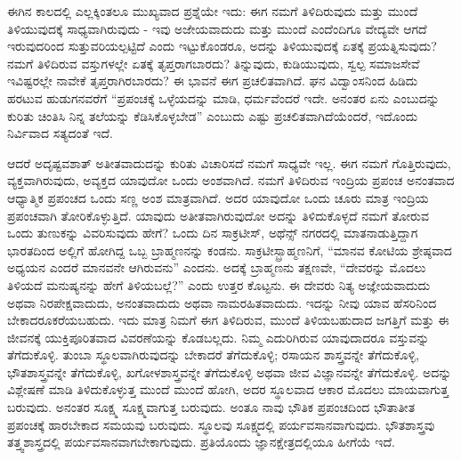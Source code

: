 ಈಗಿನ ಕಾಲದಲ್ಲಿ ಎಲ್ಲಕ್ಕಿಂತಲೂ ಮುಖ್ಯವಾದ ಪ್ರಶ್ನೆಯೇ ಇದು: ಈಗ ನಮಗೆ ತಿಳಿದಿರುವುದು ಮತ್ತು ಮುಂದೆ ತಿಳಿಯುವುದಕ್ಕೆ ಸಾಧ್ಯವಾಗಿರುವುದು - ಇವು ಅಜೇಯ\-ವಾದುದು ಮತ್ತು ಮುಂದೆ ಎಂದೆಂದಿಗೂ ವೇದ್ಯವೇ ಆಗದೆ ಇರುವುದರಿಂದ ಸುತ್ತುವರಿಯಲ್ಪಟ್ಟಿದೆ ಎಂದು ಇಟ್ಟುಕೊಂಡರೂ, ಅದನ್ನು ತಿಳಿಯುವುದಕ್ಕೆ ಏತಕ್ಕೆ ಪ್ರಯತ್ನಿಸುವುದು? ನಮಗೆ ತಿಳಿದಿರುವ ವಸ್ತುಗಳಲ್ಲೇ ಏತಕ್ಕೆ ತೃಪ್ತರಾಗಬಾರದು? ತಿನ್ನುವುದು, ಕುಡಿಯುವುದು, ಸ್ವಲ್ಪ ಸಮಾಜಸೇವೆ ಇವಿಷ್ಟರಲ್ಲೇ ನಾವೇಕೆ ತೃಪ್ತರಾಗಿರಬಾರದು? ಈ ಭಾವನೆ ಈಗ ಪ್ರಚಲಿತವಾಗಿದೆ. ಘನ ವಿದ್ವಾಂಸನಿಂದ ಹಿಡಿದು ಹರಟುವ ಹುಡುಗನವರೆಗೆ “ಪ್ರಪಂಚಕ್ಕೆ ಒಳ್ಳೆಯದನ್ನು ಮಾಡಿ, ಧರ್ಮವೆಂದರೆ ಇದೇ. ಅನಂತರ ಏನು ಎಂಬುದನ್ನು ಕುರಿತು ಚಿಂತಿಸಿ ನಿನ್ನ ತಲೆಯನ್ನು ಕೆಡಿಸಿಕೊಳ್ಳಬೇಡ” ಎಂಬುದು ಎಷ್ಟು ಪ್ರಚಲಿತವಾಗಿದೆಯೆಂದರೆ, ಇದೊಂದು ನಿರ್ವಿವಾದ ಸತ್ಯದಂತೆ ಇದೆ.

ಆದರೆ ಅದೃಷ್ಟವಶಾತ್ ಅತೀತವಾದುದನ್ನು ಕುರಿತು ವಿಚಾರಿಸದೆ ನಮಗೆ ಸಾಧ್ಯವೇ ಇಲ್ಲ. ಈಗ ನಮಗೆ ಗೊತ್ತಿರುವುದು, ವ್ಯಕ್ತವಾಗಿರುವುದು, ಅವ್ಯಕ್ತದ ಯಾವುದೋ ಒಂದು ಅಂಶವಾಗಿದೆ. ನಮಗೆ ತಿಳಿದಿರುವ ಇಂದ್ರಿಯ ಪ್ರಪಂಚ ಅನಂತವಾದ ಆಧ್ಯಾತ್ಮಿಕ ಪ್ರಪಂಚದ ಒಂದು ಸಣ್ಣ ಅಂಶ ಮಾತ್ರವಾಗಿದೆ. ಅದರ ಯಾವುದೋ ಒಂದು ಚೂರು ಮಾತ್ರ ಇಂದ್ರಿಯ ಪ್ರಪಂಚವಾಗಿ ತೋರಿಕೊಳ್ಳುತ್ತಿದೆ. ಯಾವುದು ಅತೀತವಾಗಿರುವುದೋ ಅದನ್ನು ತಿಳಿದುಕೊಳ್ಳದೆ ನಮಗೆ ತೋರುವ ಒಂದು ತುಣುಕನ್ನು ವಿವರಿಸುವುದು ಹೇಗೆ? ಒಂದು ದಿನ ಸಾಕ್ರಟೀಸ್, ಅಥೆನ್ಸ್ ನಗರದಲ್ಲಿ ಮಾತನಾಡುತ್ತಿದ್ದಾಗ ಭಾರತದಿಂದ ಅಲ್ಲಿಗೆ ಹೋಗಿದ್ದ ಒಬ್ಬ ಬ್ರಾಹ್ಮಣನನ್ನು ಕಂಡನು. ಸಾಕ್ರಟೀಸ್\break ಬ್ರಾಹ್ಮಣನಿಗೆ, “ಮಾನವ ಕೋಟಿಯ ಶ್ರೇಷ್ಠವಾದ ಅಧ್ಯಯನ ಎಂದರೆ ಮಾನವನೇ ಆಗಿರುವನು” ಎಂದನು. ಅದಕ್ಕೆ ಬ್ರಾಹ್ಮಣನು ತಕ್ಷಣವೇ, “ದೇವರನ್ನು ಮೊದಲು ತಿಳಿಯದೆ ಮನುಷ್ಯನನ್ನು ಹೇಗೆ ತಿಳಿಯಬಲ್ಲೆ?'' ಎಂದು ಉತ್ತರ ಕೊಟ್ಟನು. ಈ ದೇವರು ನಿತ್ಯ ಅಜ್ಞೇಯವಾದುದು ಅಥವಾ ನಿರಪೇಕ್ಷವಾದುದು, ಅನಂತವಾದುದು ಅಥವಾ ನಾಮರಹಿತವಾದುದು. ಇದನ್ನು ನೀವು ಯಾವ ಹೆಸರಿನಿಂದ ಬೇಕಾದರೂಕರೆಯಬಹುದು. ಇದು ಮಾತ್ರ ನಿಮಗೆ ಈಗ ತಿಳಿದಿರುವ, ಮುಂದೆ ತಿಳಿಯಬಹುದಾದ ಜಗತ್ತಿಗೆ ಮತ್ತು ಈ ಜೀವನಕ್ಕೆ ಯುಕ್ತಿಪೂರಿತವಾದ ವಿವರಣೆಯನ್ನು ಕೊಡಬಲ್ಲದು. ನಿಮ್ಮ ಎದುರಿಗಿರುವ ಯಾವುದಾದರೂ ವಸ್ತುವನ್ನು ತೆಗೆದುಕೊಳ್ಳಿ. ತುಂಬಾ ಸ್ಥೂಲವಾಗಿರುವುದನ್ನು ಬೇಕಾದರೆ ತೆಗೆದುಕೊಳ್ಳಿ; ರಸಾಯನ ಶಾಸ್ತ್ರವನ್ನೇ ತೆಗೆದುಕೊಳ್ಳಿ, ಭೌತಶಾಸ್ತ್ರವನ್ನೇ ತೆಗೆದುಕೊಳ್ಳಿ, ಖಗೋಳಶಾಸ್ತ್ರವನ್ನೇ ತೆಗೆದುಕೊಳ್ಳಿ ಅಥವಾ ಜೀವ ವಿಜ್ಞಾನವನ್ನೇ ತೆಗೆದುಕೊಳ್ಳಿ. ಅದನ್ನು ವಿಶ್ಲೇಷಣೆ ಮಾಡಿ ತಿಳಿದುಕೊಳ್ಳುತ್ತ ಮುಂದೆ ಮುಂದೆ ಹೋಗಿ, ಅದರ ಸ್ಥೂಲವಾದ ಆಕಾರ ಮೊದಲು ಮಾಯವಾಗುತ್ತ ಬರುವುದು. ಅನಂತರ ಸೂಕ್ಷ್ಮ ಸೂಕ್ಷ್ಮವಾಗುತ್ತ ಬರುವುದು. ಅಂತೂ ನಾವು ಭೌತಿಕ ಪ್ರಪಂಚದಿಂದ ಭೌತಾತೀತ ಪ್ರಪಂಚಕ್ಕೆ ಹಾರಬೇಕಾದ ಸಮಯವು ಬರುವುದು. ಸ್ಥೂಲವು ಸೂಕ್ಷ್ಮದಲ್ಲಿ ಪರ್ಯವಸಾನವಾಗುವುದು. ಭೌತಶಾಸ್ತ್ರವು ತತ್ತ್ವಶಾಸ್ತ್ರದಲ್ಲಿ ಪರ್ಯವಸಾನವಾಗಬೇಕಾಗುವುದು. ಪ್ರತಿಯೊಂದು ಜ್ಞಾನಕ್ಷೇತ್ರದಲ್ಲಿಯೂ ಹೀಗೆಯೆ ಇದೆ.

